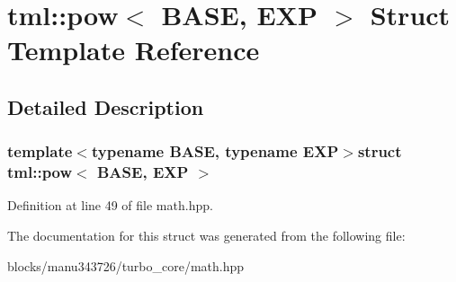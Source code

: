 \hypertarget{structtml_1_1pow}{\section{tml\+:\+:pow$<$ B\+A\+S\+E, E\+X\+P $>$ Struct Template Reference}
\label{structtml_1_1pow}
}


\subsection{Detailed Description}
\subsubsection*{template$<$typename B\+A\+S\+E, typename E\+X\+P$>$struct tml\+::pow$<$ B\+A\+S\+E, E\+X\+P $>$}



Definition at line 49 of file math.\+hpp.



The documentation for this struct was generated from the following file\+:\begin{DoxyCompactItemize}
\item 
blocks/manu343726/turbo\+\_\+core/math.\+hpp\end{DoxyCompactItemize}
